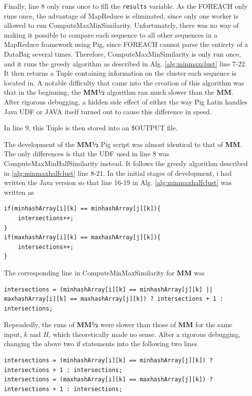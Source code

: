 \documentclass[../../main.tex]{subfiles}
\begin{document}
Finally, line 8 only runs once to fill the \texttt{results} variable. As the FOREACH only runs once, the advantage of MapReduce is eliminated, since only one worker is allowed to run ComputeMaxMinSimilarity. Unfortunately, there was no way of making it possible to compare each sequence to all other sequences in a MapReduce framework using Pig, since FOREACH cannot parse the entirety of a DataBag several times. Therefore, ComputeMaxMinSimilarity is only run once, and it runs the greedy algorithm as described in Alg. \ref{alg:minmaxclust} line 7-22. It then returns a Tuple containing information on the cluster each sequence is located in. A notable difficulty that came into the creation of this algorithm was that in the beginning, the {\bf MM½} algorithm ran much slower than the {\bf MM}. After rigorous debugging, a hidden side effect of either the way Pig Latin handles Java UDF or JAVA itself turned out to cause this difference in speed.

In line 9, this Tuple is then stored into an \$OUTPUT file.

The development of the {\bf MM½} Pig script was almost identical to that of {\bf MM}. The only differences is that the UDF used in line 8 was ComputeMaxMinHalfSimilarity instead. It follows the greedy algorithm described in \ref{alg:minmaxhalfclust} line 8-21. In the initial stages of development, i had written the Java version so that line 16-19 in Alg. \ref{alg:minmaxhalfclust} was written as

\begin{lstlisting}
if(minhashArray[i][k] == minhashArray[j][k]){
	intersections++;
}
if(maxhashArray[i][k] == maxhashArray[j][k]){
	intersections++;
}
\end{lstlisting}

The corresponding line in ComputeMinMaxSimilarity for {\bf MM} was

\begin{lstlisting}
intersections = (minhashArray[i][k] == minhashArray[j][k] || maxhashArray[i][k] == maxhashArray[j][k]) ? intersections + 1 : intersections;
\end{lstlisting}

Repeadedly, the runs of {\bf MM½} were slower than those of {\bf MM} for the same input, $k$ and $H$, which theoretically made no sense. After a rigorous debugging, changing the above two if statements into the following two lines

\begin{lstlisting}
intersections = (minhashArray[i][k] == minhashArray[j][k]) ? intersections + 1 : intersections;
intersections = (maxhashArray[i][k] == maxhashArray[j][k]) ? intersections + 1 : intersections;
\end{lstlisting}
\end{document}
